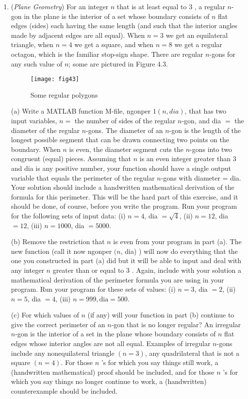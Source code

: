 \documentclass[../main.tex]{subfiles}
\begin{document}
\begin{enumerate}
\item (\emph{Plane Geometry}) For an integer $n$ that is at least equal to 3 , a regular $n$-gon in the plane is the interior of a set whose boundary consists of $n$ flat edges (sides) each having the same length (and such that the interior angles made by adjacent edges are all equal). When $n=3$ we get an equilateral triangle, when $n=4$ we get a square, and when $n=8$ we get a regular octagon, which is the familiar stop-sign shape. There are regular $n$-gons for any such value of $n$; some are pictured in Figure 4.3.\\

\begin{figure}[H]
\texttt{[image: fig43]}
\caption{Some regular polygons}
\label{fig:fig_4_3}
\end{figure}

(a) Write a MATLAB function M-file, ngonper $1(n, d i a)$, that has two input variables, $n=$ the number of sides of the regular $n$-gon, and dia $=$ the diameter of the regular $n$-gons. The diameter of an $n$-gon is the length of the longest possible segment that can be drawn connecting two points on the boundary. When $n$ is even, the diameter segment cuts the $n$-gons into two congruent (equal) pieces. Assuming that $n$ is an even integer greater than 3 and dia is any positive number, your function should have a single output variable that equals the perimeter of the regular $n$-gons with diameter = dia. Your solution should include a handwritten mathematical derivation of the formula for this perimeter. This will be the hard part of this exercise, and it should be done, of course, before you write the program. Run your program for the following sets of input data: (i) $n=4$, dia $=\sqrt{4}$, (ii) $n=12$, dia $=12$, (iii) $n=1000$, dia $=5000$.

(b) Remove the restriction that $n$ is even from your program in part (a). The new function (call it now ngonper $(n$, dia) ) will now do everything that the one you constructed in part (a) did but it will be able to input and deal with any integer $n$ greater than or equal to 3 . Again, include with your solution a mathematical derivation of the perimeter formula you are using in your program. Run your program for these sets of values: (i) $n=3$, dia $=2$, (ii) $n=5$, dia $=4$, (iii) $n=999, \mathrm{dia}=500$.

(c) For which values of $n$ (if any) will your function in part (b) continue to give the correct perimeter of an $n$-gon that is no longer regular? An irregular $n$-gon is the interior of a set in the plane whose boundary consists of $n$ flat edges whose interior angles are not all equal. Examples of irregular $n$-gons include any nonequilateral triangle $(n=3)$, any quadrilateral that is not a square $(n=4)$. For those $n$ 's for which you say things still work, a (handwritten mathematical) proof should be included, and for those $n$ 's for which you say things no longer continue to work, a (handwritten) counterexample should be included.


\end{enumerate}
\end{document}
